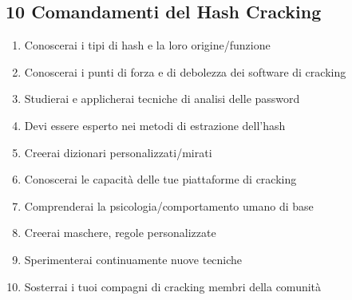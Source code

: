 \newpage

\subsection{10 Comandamenti del Hash Cracking}

\begin{enumerate}

    \item Conoscerai i tipi di hash e la loro origine/funzione
    \item Conoscerai i punti di forza e di debolezza dei software di cracking
    \item Studierai e applicherai tecniche di analisi delle password
    \item Devi essere esperto nei metodi di estrazione dell'hash
    \item Creerai dizionari personalizzati/mirati
    \item Conoscerai le capacità delle tue piattaforme di cracking
    \item Comprenderai la psicologia/comportamento umano di base
    \item Creerai maschere, regole personalizzate
    \item Sperimenterai continuamente nuove tecniche
    \item Sosterrai i tuoi compagni di cracking membri della comunità

\end{enumerate}
